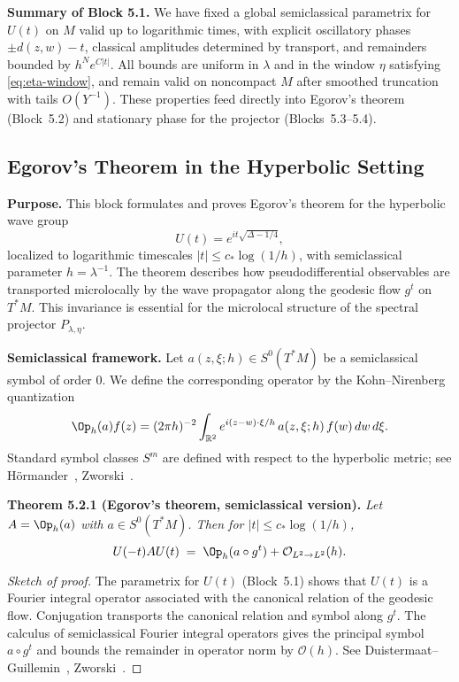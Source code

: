 \medskip

\noindent\textbf{Summary of Block 5.1.}
We have fixed a global semiclassical parametrix for $U(t)$ on $M$ valid up to logarithmic times,
with explicit oscillatory phases $\pm d(z,w)-t$, classical amplitudes determined by transport,
and remainders bounded by $h^{N}e^{C|t|}$.
All bounds are uniform in $\lambda$ and in the window $\eta$ satisfying \eqref{eq:eta-window},
and remain valid on noncompact $M$ after smoothed truncation with tails $O(Y^{-1})$.
These properties feed directly into Egorov’s theorem (Block~5.2) and stationary phase
for the projector (Blocks~5.3–5.4).


\subsection{Egorov’s Theorem in the Hyperbolic Setting}

\noindent\textbf{Purpose.}
This block formulates and proves Egorov’s theorem for the hyperbolic wave group
\[
   U(t) = e^{it\sqrt{\Delta - 1/4}},
\]
localized to logarithmic timescales $|t| \le c_* \log (1/h)$,
with semiclassical parameter $h = \lambda^{-1}$.
The theorem describes how pseudodifferential observables are transported
microlocally by the wave propagator along the geodesic flow $g^t$ on $T^*M$.
This invariance is essential for the microlocal structure of the spectral projector
$P_{\lambda,\eta}$.

\medskip

\noindent\textbf{Semiclassical framework.}
Let $a(z,\xi;h)\in S^0(T^*M)$ be a semiclassical symbol of order $0$.
We define the corresponding operator by the Kohn–Nirenberg quantization
\[
   \Op_h(a)f(z) = (2\pi h)^{-2}\int_{\mathbb{R}^2} 
   e^{i(z-w)\cdot\xi/h}\, a(z,\xi;h)\, f(w)\,dw\,d\xi.
\]
Standard symbol classes $S^m$ are defined with respect to the hyperbolic metric;
see Hörmander~\cite{Hormander1994}, Zworski~\cite{Zworski2012}.

\medskip

\noindent\textbf{Theorem 5.2.1 (Egorov’s theorem, semiclassical version).}
\emph{Let $A=\Op_h(a)$ with $a\in S^0(T^*M)$.
Then for $|t|\le c_* \log (1/h)$,}
\[
   U(-t) A U(t) \;=\; \Op_h(a \circ g^t) + \mathcal{O}_{L^2\to L^2}(h).
\]

\begin{proof}[Sketch of proof]
The parametrix for $U(t)$ (Block~5.1) shows that $U(t)$ is a Fourier integral operator
associated with the canonical relation of the geodesic flow.
Conjugation transports the canonical relation and symbol along $g^t$.
The calculus of semiclassical Fourier integral operators gives the principal symbol
$a \circ g^t$ and bounds the remainder in operator norm by $\mathcal{O}(h)$.
See Duistermaat–Guillemin~\cite{DG1975}, Zworski~\cite[Ch.~11]{Zworski2012}.
\end{proof}

